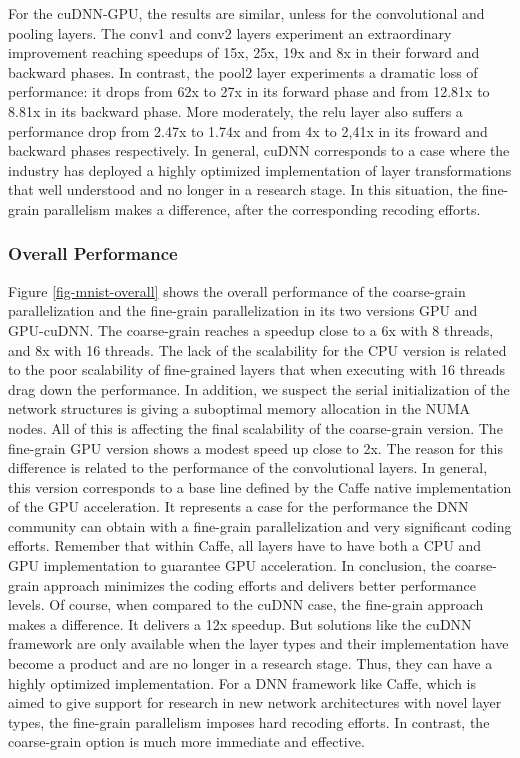 For the cuDNN-GPU, the results are similar, unless for the convolutional 
and pooling layers. The conv1 and conv2 layers experiment an extraordinary 
improvement reaching speedups of 15x, 25x, 19x and 8x in their 
forward and backward phases. In contrast, the pool2 layer experiments a 
dramatic loss of performance: it drops from 62x to 27x in its forward 
phase and from 12.81x to 8.81x in its backward phase. More moderately, 
the relu layer also suffers a performance drop from 2.47x to 1.74x and 
from 4x to 2,41x in its froward and backward phases respectively. 
In general, cuDNN corresponds to a case where the industry has deployed 
a highly optimized implementation of layer transformations that well 
understood and no longer in a research stage. In this situation, the 
fine-grain parallelism makes a difference, after the corresponding recoding 
efforts.


\subsubsection{Overall Performance}
Figure \ref{fig-mnist-overall} shows the overall performance of
the coarse-grain parallelization and the fine-grain parallelization in 
its two versions GPU and GPU-cuDNN. The coarse-grain reaches a speedup 
close to a 6x with 8 threads, and 8x with 16 threads. The lack of 
the scalability for the CPU version is related to the poor scalability 
of fine-grained layers that when executing with 16 threads drag down 
the performance. In addition, we suspect the serial initialization of 
the network structures is giving a suboptimal memory allocation in 
the NUMA nodes. All of this is affecting the final scalability of 
the coarse-grain version. The fine-grain GPU version shows a 
modest speed up close to 2x. The reason for this difference is related 
to the performance of the convolutional layers. In general, this version 
corresponds to a base line defined by the Caffe native implementation 
of the GPU acceleration. It represents a case for the performance the DNN 
community can obtain with a fine-grain parallelization and very significant 
coding efforts. Remember that within Caffe, all layers have to have 
both a CPU and GPU implementation to guarantee GPU acceleration. 
In conclusion, the coarse-grain approach minimizes the coding efforts 
and delivers better performance levels. Of course, when compared to 
the cuDNN case, the fine-grain approach makes a difference. 
It delivers a 12x speedup. But solutions like the cuDNN framework are 
only available when the layer types and their implementation have become 
a product and are no longer in a research stage. Thus, they can have a 
highly optimized implementation. For a DNN framework like Caffe, 
which is aimed to give support for research in new network architectures 
with novel layer types, the fine-grain parallelism imposes hard recoding 
efforts. In contrast, the coarse-grain option is much more immediate and 
effective.

